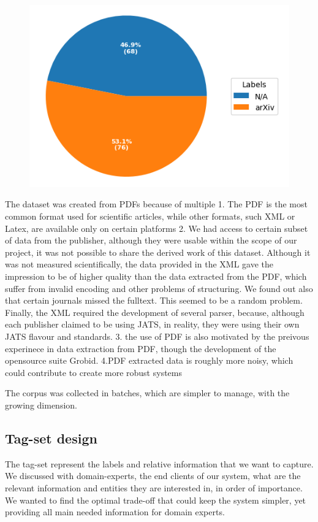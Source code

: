 \documentclass[a4paper,10pt]{article}
\begin{document}
\begin{figure}[h]
    \centering
    \includegraphics[width=\linewidth]{pie-arxiv-papers.png}
    \label{fig:keyword-top10-body}
\end{figure}

The dataset was created from PDFs because of multiple 
1. The PDF is the most common format used for scientific articles, while other formats, such XML or Latex, are available only on certain platforms
2. We had access to certain subset of data from the publisher, although they were usable within the scope of our project, it was not possible to share the derived work of this dataset. Although it was not measured scientifically, the data provided in the XML gave the impression to be of higher quality than the data extracted from the PDF, which suffer from invalid encoding and other problems of structuring. We found out also that certain journals missed the fulltext. This seemed to be a random problem. Finally, the XML required the development of several parser, because, although each publisher claimed to be using JATS, in reality, they were using their own JATS flavour and standards. 
3. the use of PDF is also motivated by the preivous experinece in data extraction from PDF, though the development of the opensource suite Grobid.  
4.PDF extracted data is roughly more noisy, which could contribute to create more robust systems 

The corpus was collected in batches, which are simpler to manage, with the growing dimension. 

\subsection{Tag-set design}
The tag-set represent the labels and relative information that we want to capture. We discussed with domain-experts, the end clients of our system, what are the relevant information and entities they are interested in, in order of importance. We wanted to find the optimal trade-off that could keep the system simpler, yet providing all main needed information for domain experts. 
\end{document}
